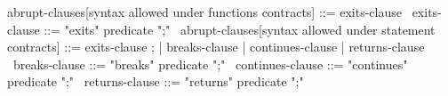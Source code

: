 \begin{syntax}
  abrupt-clauses[syntax allowed under functions contracts] ::= exits-clause
  \
  exits-clause ::= {"exits" predicate ";"}
  \
  abrupt-clauses[syntax allowed under statement contracts] ::= exits-clause ;
        | breaks-clause | continues-clause | returns-clause
  \
  breaks-clause ::= {"breaks" predicate ";"}
  \
  continues-clause ::= {"continues" predicate ";"}
  \
  returns-clause ::= {"returns" predicate ";"}
\end{syntax}